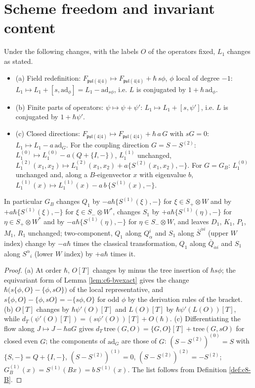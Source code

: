 \section{Scheme freedom and invariant content}

\begin{proposition}
\label{prop:c8-laws}
Under the following changes, with the labels $O$ of the operators fixed, $L_1$ changes as stated.
\begin{itemize}
\item (a) Field redefinition: $F_{\mathfrak{psl}(4|4)}\mapsto F_{\mathfrak{psl}(4|4)}+\hbar\,s\phi$, $\phi$ local of degree $-1$: $L_1\mapsto L_1+[s,\mathrm{ad}_\phi]=L_1-\mathrm{ad}_{s\phi}$, i.e. $L$ is conjugated by $1+\hbar\,\mathrm{ad}_\phi$.
\item (b) Finite parts of operators: $\psi\mapsto\psi+\psi'$: $L_1\mapsto L_1+[s,\psi']$, i.e. $L$ is conjugated by $1+\hbar\psi'$.
\item (c) Closed directions: $F_{\mathfrak{psl}(4|4)}\mapsto F_{\mathfrak{psl}(4|4)}+\hbar\,a\,G$ with $sG=0$: $L_1\mapsto L_1-a\,\mathrm{ad}_G$. For the coupling direction $G=S-S^{(2)}$: $L_1^{(0)}\mapsto L_1^{(0)}-a(Q+\{I,-\})$, $L_1^{(1)}$ unchanged, $L_1^{(2)}(x_1,x_2)\mapsto L_1^{(2)}(x_1,x_2)+a\{S^{(2)}(x_1,x_2),-\}$. For $G=G_B$: $L_1^{(0)}$ unchanged and, along a $B$-eigenvector $x$ with eigenvalue $b$, $L_1^{(1)}(x)\mapsto L_1^{(1)}(x)-a\,b\,\{S^{(1)}(x),-\}$.
\end{itemize}
In particular $G_B$ changes $Q_1$ by $-a\hbar\{S^{(1)}(\xi),-\}$ for $\xi\in S_+\otimes W$ and by $+a\hbar\{S^{(1)}(\xi),-\}$ for $\xi\in S_-\otimes W^*$, changes $S_1$ by $+a\hbar\{S^{(1)}(\eta),-\}$ for $\eta\in S_+\otimes W^*$ and by $-a\hbar\{S^{(1)}(\eta),-\}$ for $\eta\in S_-\otimes W$, and leaves $D_1$, $K_1$, $P_1$, $M_1$, $R_1$ unchanged; two-component, $Q_1$ along $Q^i_\alpha$ and $S_1$ along $\bar S^{\dot\alpha i}$ (upper $W$ index) change by $-a\hbar$ times the classical transformation, $Q_1$ along $\bar Q_{\dot\alpha i}$ and $S_1$ along $S^\alpha{}_i$ (lower $W$ index) by $+a\hbar$ times it.
\end{proposition}

\begin{proof}
(a) At order $\hbar$, $O[T]$ changes by minus the tree insertion of $\hbar s\phi$; the equivariant form of Lemma \ref{lem:c6-bvexact} gives the change $\hbar\big(s\{\phi,O\}-\{\phi,sO\}\big)$ of the local representative, and $s\{\phi,O\}-\{\phi,sO\}=-\{s\phi,O\}$ for odd $\phi$ by the derivation rules of the bracket. (b) $O[T]$ changes by $\hbar\psi'(O)[T]$ and $L(O)[T]$ by $\hbar\psi'(L(O))[T]$, while $d_T(\psi'(O)[T])=(s\psi'(O))[T]+O(\hbar)$. (c) Differentiating the flow along $J\mapsto J-\hbar aG$ gives $d_T\,\mathrm{tree}(G,O)=\{G,O\}[T]+\mathrm{tree}(G,sO)$ for closed even $G$; the components of $\mathrm{ad}_G$ are those of $G$: $(S-S^{(2)})^{(0)}=S$ with $\{S,-\}=Q+\{I,-\}$, $(S-S^{(2)})^{(1)}=0$, $(S-S^{(2)})^{(2)}=-S^{(2)}$; $G_B^{(1)}(x)=S^{(1)}(Bx)=b\,S^{(1)}(x)$. The list follows from Definition \ref{def:c8-B}.
\end{proof}

